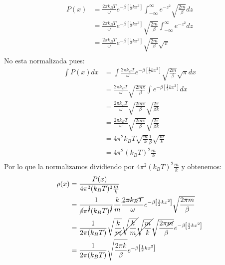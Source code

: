 \documentclass[a4paper]{article}
\begin{document}
\begin{answer}
        \begin{align*}
            P(x) &= \frac{2 \pi k_B T}{\omega} e^{-\beta\left[\frac{1}{2} k x^2\right]} \int_{-\infty}^{\infty} e^{-z^2} \sqrt{ \frac{2 m}{\beta}} d z \\
            &= \frac{2 \pi k_B T}{\omega} e^{-\beta\left[\frac{1}{2} k x^2\right]} \sqrt{\frac{2 m}{\beta}}  \int_{-\infty}^{\infty} e^{-z^2} d z \\
            &= \frac{2 \pi k_B T}{\omega} e^{-\beta\left[\frac{1}{2} k x^2\right]} \sqrt{\frac{2 m}{\beta}} \sqrt{\pi} \\
        \end{align*}
        No esta normalizada pues:
        \begin{align*}
            \int P(x) dx &= \int \frac{2 \pi k_B T}{\omega} e^{-\beta\left[\frac{1}{2} k x^2\right]} \sqrt{\frac{2 m}{\beta}} \sqrt{\pi} dx \\
            &= \frac{2 \pi k_B T}{\omega} \sqrt{\frac{2m \pi }{\beta}} \int e^{-\beta\left[\frac{1}{2} k x^2\right]} dx \\
            &= \frac{2 \pi k_B T}{\omega} \sqrt{\frac{2m \pi }{\beta}} \sqrt{\frac{2 \pi}{\beta k}} \\
            &= \frac{2 \pi k_B T}{\omega} \sqrt{\frac{2m \pi }{\beta}} \sqrt{\frac{2 \pi}{\beta k}} \\
            &= 4 \pi^2 k_B T \sqrt{\frac mk} \frac 1\beta \sqrt{\frac mk}\\
            &= 4 \pi^2 (k_B T)^2 \frac mk \\
        \end{align*}
        Por lo que la normalizamos dividiendo por $4 \pi^2 (k_B T)^2 \frac mk$ y obtenemos:
        \begin{align*}
            \rho(x) &= \frac{P(x)}{4 \pi^2 (k_B T)^2 \frac mk} \\
            &=\frac{1}{\cancel 4 \pi^{\cancel 2} (k_B T)^{\cancel 2}}\frac{k}{m} \frac{\cancel {2\pi k_B T}}{\omega} e^{-\beta\left[\frac{1}{2} k x^2\right]} \sqrt{\frac{2 \pi m}{\beta}} \\
            &= \frac{1}{2 \pi (k_B T)} \sqrt{\frac{k}{\cancel m}} \cancel{\sqrt{\frac{k}{m}}} \cancel{\sqrt{\frac{m}{k}}} \sqrt{\frac{2 \pi \cancel m}{\beta}} e^{-\beta\left[\frac{1}{2} k x^2\right]} \\
            &= \frac{1}{2 \pi (k_B T)} \sqrt{\frac{2\pi k}{\beta}} e^{-\beta\left[\frac{1}{2} k x^2\right]}\\
        \end{align*}

\end{answer}
\end{document}

